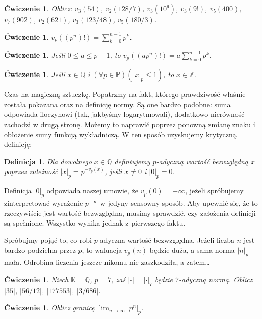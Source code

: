 \documentclass[a4paper,fleqn]{article}
\newtheorem{prb}[prbh]{\'Cwiczenie}
\newtheorem{dff}{Definicja}
\begin{document}
\begin{multicols}{2}
\begin{prb}Oblicz: $v_{3}(54)$,  $v_{2}(128/7)$, $v_{3}(10^9)$, $v_3(9!)$, $v_5(400)$, $v_7(902)$, $v_2(621)$, $v_3(123/48)$, $v_5(180/3)$.\end{prb}

\begin{prb}$v_p((p^n)!) = \sum_{k=0}^{n-1}p^k$.\end{prb}

\begin{prb}Jeśli $0\le a\le p-1$, to $v_p((ap^n)!) = a\sum_{k=0}^{n-1}p^k$.\end{prb}

\begin{prb}Jeśli $x\in \mathbb Q$ i $(\forall p\in\mathbb P)(|x|_p \le 1)$, to $x\in\mathbb Z$.\end{prb}

Czas na magiczną sztuczkę. Popatrzmy na fakt, którego prawdziwość właśnie została pokazana oraz na definicję normy. Są one bardzo podobne: suma odpowiada iloczynowi (tak, jakbyśmy logarytmowali), dodatkowo nierówność zachodzi w drugą stronę. Możemy to naprawić poprzez ponowną zmianę znaku i obłożenie sumy funkcją wykładniczą. W ten sposób uzyskujemy krytyczną definicję:

\begin{dff}Dla dowolnego $x\in\mathbb Q$ definiujemy $p$-adyczną wartość bezwzględną $x$ poprzez zależność $|x|_p = p^{-v_p(x)}$, jeśli $x\neq 0$ i $|0|_p = 0$. \end{dff}

Definicja $|0|_p$ odpowiada naszej umowie, że $v_p(0) = + \infty$, jeżeli spróbujemy zinterpretować wyrażenie $p^{-\infty}$ w jedyny sensowny sposób. Aby upewnić się, że to rzeczywiście jest wartość bezwzględna, musimy sprawdzić, czy założenia definicji są spełnione. Wszystko wynika jednak z pierwszego faktu.

Spróbujmy pojąć to, co robi $p$-adyczna wartość bezwzględna. Jeżeli liczba $n$ jest bardzo podzielna przez $p$, to waluacja $v_p(n)$ będzie duża, a sama norma $|n|_p$ -- mała. Odrobina liczenia jeszcze nikomu nie zaszkodziła, a zatem…

\begin{prb}Niech $\mathbb K = \mathbb Q$, $p=7$, zaś $|\cdot| = |\cdot|_7$ będzie $7$-adyczną normą. Oblicz $|35|$, $|56/12|$, $|177553|$, $|3/686|$.\end{prb}


\begin{prb}Oblicz granicę $\lim_{n\to\infty} |p^n|_p$.\end{prb}


\end{multicols}
\end{document}
